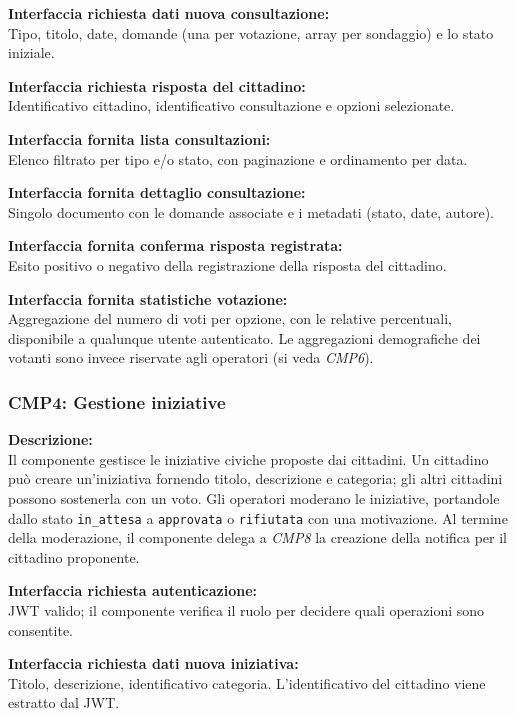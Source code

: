 \documentclass[12pt, a4paper]{article}
\newcommand{\interfacciarichiesta}[1]{\textbf{Interfaccia richiesta #1:}}
\newcommand{\interfacciafornita}[1]{\textbf{Interfaccia fornita #1:}}
\begin{document}
\interfacciarichiesta{dati nuova consultazione}\\
Tipo, titolo, date, domande (una per votazione, array per sondaggio) e lo stato iniziale.

\interfacciarichiesta{risposta del cittadino}\\
Identificativo cittadino, identificativo consultazione e opzioni selezionate.

\interfacciafornita{lista consultazioni}\\
Elenco filtrato per tipo e/o stato, con paginazione e ordinamento per data.

\interfacciafornita{dettaglio consultazione}\\
Singolo documento con le domande associate e i metadati (stato, date, autore).

\interfacciafornita{conferma risposta registrata}\\
Esito positivo o negativo della registrazione della risposta del cittadino.

\interfacciafornita{statistiche votazione}\\
Aggregazione del numero di voti per opzione, con le relative percentuali, disponibile a qualunque
utente autenticato. Le aggregazioni demografiche dei votanti sono invece riservate agli operatori
(si veda \textit{CMP6}).

\subsubsection*{CMP4: Gestione iniziative}

\textbf{Descrizione:}\\
Il componente gestisce le iniziative civiche proposte dai cittadini. Un cittadino può creare
un'iniziativa fornendo titolo, descrizione e categoria; gli altri cittadini possono sostenerla con
un voto. Gli operatori moderano le iniziative, portandole dallo stato \texttt{in\_attesa} a
\texttt{approvata} o \texttt{rifiutata} con una motivazione. Al termine della moderazione, il
componente delega a \textit{CMP8} la creazione della notifica per il cittadino proponente.

\interfacciarichiesta{autenticazione}\\
JWT valido; il componente verifica il ruolo per decidere quali operazioni sono consentite.

\interfacciarichiesta{dati nuova iniziativa}\\
Titolo, descrizione, identificativo categoria. L'identificativo del cittadino viene estratto dal JWT.
\end{document}

